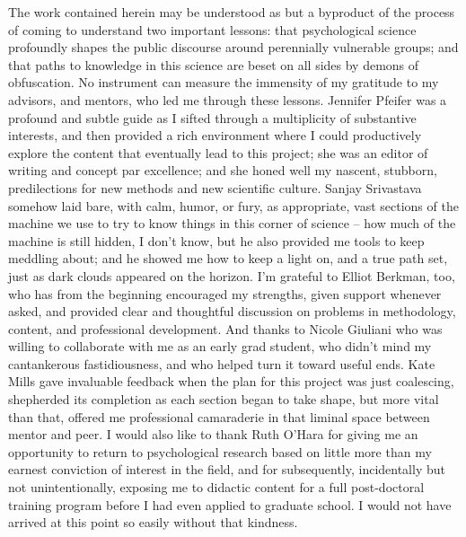 The work contained herein may be understood as but a byproduct of the process of coming to understand two important lessons: that psychological science profoundly shapes the public discourse around perennially vulnerable groups; and that paths to knowledge in this science are beset on all sides by demons of obfuscation.
No instrument can measure the immensity of my gratitude to my advisors, and mentors, who led me through these lessons.
Jennifer Pfeifer was a profound and subtle guide as I sifted through a multiplicity of substantive interests, and then provided a rich environment where I could productively explore the content that eventually lead to this project; she was an editor of writing and concept par excellence; and she honed well my nascent, stubborn, predilections for new methods and new scientific culture.
Sanjay Srivastava somehow laid bare, with calm, humor, or fury, as appropriate, vast sections of the machine we use to try to know things in this corner of science -- how much of the machine is still hidden, I don't know, but he also provided me tools to keep meddling about; and he showed me how to keep a light on, and a true path set, just as dark clouds appeared on the horizon.
I'm grateful to Elliot Berkman, too, who has from the beginning encouraged my strengths, given support whenever asked, and provided clear and thoughtful discussion on problems in methodology, content, and professional development.
And thanks to Nicole Giuliani who was willing to collaborate with me as an early grad student, who didn't mind my cantankerous fastidiousness, and who helped turn it toward useful ends.
Kate Mills gave invaluable feedback when the plan for this project was just coalescing, shepherded its completion as each section began to take shape, but more vital than that, offered me professional camaraderie in that liminal space between mentor and peer.
I would also like to thank Ruth O'Hara for giving me an opportunity to return to psychological research based on little more than my earnest conviction of interest in the field, and for subsequently, incidentally but not unintentionally, exposing me to didactic content for a full post-doctoral training program before I had even applied to graduate school.
I would not have arrived at this point so easily without that kindness.

